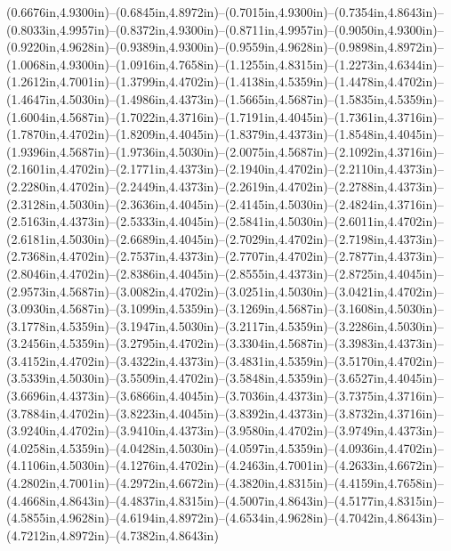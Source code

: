 (0.6676in,4.9300in)--(0.6845in,4.8972in)--(0.7015in,4.9300in)--(0.7354in,4.8643in)--(0.8033in,4.9957in)--(0.8372in,4.9300in)--(0.8711in,4.9957in)--(0.9050in,4.9300in)--(0.9220in,4.9628in)--(0.9389in,4.9300in)--(0.9559in,4.9628in)--(0.9898in,4.8972in)--(1.0068in,4.9300in)--(1.0916in,4.7658in)--(1.1255in,4.8315in)--(1.2273in,4.6344in)--(1.2612in,4.7001in)--(1.3799in,4.4702in)--(1.4138in,4.5359in)--(1.4478in,4.4702in)--(1.4647in,4.5030in)--(1.4986in,4.4373in)--(1.5665in,4.5687in)--(1.5835in,4.5359in)--(1.6004in,4.5687in)--(1.7022in,4.3716in)--(1.7191in,4.4045in)--(1.7361in,4.3716in)--(1.7870in,4.4702in)--(1.8209in,4.4045in)--(1.8379in,4.4373in)--(1.8548in,4.4045in)--(1.9396in,4.5687in)--(1.9736in,4.5030in)--(2.0075in,4.5687in)--(2.1092in,4.3716in)--(2.1601in,4.4702in)--(2.1771in,4.4373in)--(2.1940in,4.4702in)--(2.2110in,4.4373in)--(2.2280in,4.4702in)--(2.2449in,4.4373in)--(2.2619in,4.4702in)--(2.2788in,4.4373in)--(2.3128in,4.5030in)--(2.3636in,4.4045in)--(2.4145in,4.5030in)--(2.4824in,4.3716in)--(2.5163in,4.4373in)--(2.5333in,4.4045in)--(2.5841in,4.5030in)--(2.6011in,4.4702in)--(2.6181in,4.5030in)--(2.6689in,4.4045in)--(2.7029in,4.4702in)--(2.7198in,4.4373in)--(2.7368in,4.4702in)--(2.7537in,4.4373in)--(2.7707in,4.4702in)--(2.7877in,4.4373in)--(2.8046in,4.4702in)--(2.8386in,4.4045in)--(2.8555in,4.4373in)--(2.8725in,4.4045in)--(2.9573in,4.5687in)--(3.0082in,4.4702in)--(3.0251in,4.5030in)--(3.0421in,4.4702in)--(3.0930in,4.5687in)--(3.1099in,4.5359in)--(3.1269in,4.5687in)--(3.1608in,4.5030in)--(3.1778in,4.5359in)--(3.1947in,4.5030in)--(3.2117in,4.5359in)--(3.2286in,4.5030in)--(3.2456in,4.5359in)--(3.2795in,4.4702in)--(3.3304in,4.5687in)--(3.3983in,4.4373in)--(3.4152in,4.4702in)--(3.4322in,4.4373in)--(3.4831in,4.5359in)--(3.5170in,4.4702in)--(3.5339in,4.5030in)--(3.5509in,4.4702in)--(3.5848in,4.5359in)--(3.6527in,4.4045in)--(3.6696in,4.4373in)--(3.6866in,4.4045in)--(3.7036in,4.4373in)--(3.7375in,4.3716in)--(3.7884in,4.4702in)--(3.8223in,4.4045in)--(3.8392in,4.4373in)--(3.8732in,4.3716in)--(3.9240in,4.4702in)--(3.9410in,4.4373in)--(3.9580in,4.4702in)--(3.9749in,4.4373in)--(4.0258in,4.5359in)--(4.0428in,4.5030in)--(4.0597in,4.5359in)--(4.0936in,4.4702in)--(4.1106in,4.5030in)--(4.1276in,4.4702in)--(4.2463in,4.7001in)--(4.2633in,4.6672in)--(4.2802in,4.7001in)--(4.2972in,4.6672in)--(4.3820in,4.8315in)--(4.4159in,4.7658in)--(4.4668in,4.8643in)--(4.4837in,4.8315in)--(4.5007in,4.8643in)--(4.5177in,4.8315in)--(4.5855in,4.9628in)--(4.6194in,4.8972in)--(4.6534in,4.9628in)--(4.7042in,4.8643in)--(4.7212in,4.8972in)--(4.7382in,4.8643in) 